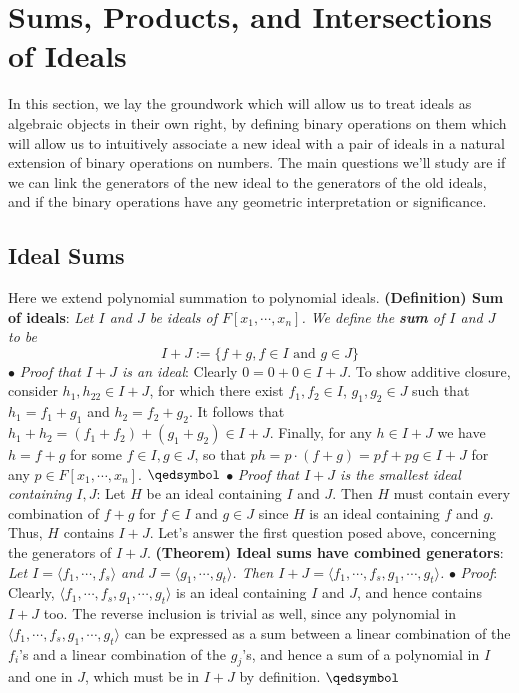 \documentclass{article}
\newcommand*{\tb}{\textbf}
\newcommand*{\ti}{\textit}
\newcommand*{\n}{\newline}
\newcommand*{\nn}{\newline \newline}
\newcommand*{\Fx}{\ensuremath{F[x_1, \cdots, x_n]}}
\newcommand*{\fs}{f_1, \cdots, f_s}
\newcommand*{\gt}{g_1, \cdots, g_t}
\newcommand*{\lfsr}{\langle f_1, \cdots, f_s \rangle}
\begin{document}
\section{Sums, Products, and Intersections of Ideals}
In this section, we lay the groundwork which will allow us to treat ideals as algebraic objects in their own right, by defining binary operations on them which will allow us to intuitively associate a new ideal with a pair of ideals in a natural extension of binary operations on numbers. The main questions we'll study are if we can link the generators of the new ideal to the generators of the old ideals, and if the binary operations have any geometric interpretation or significance.

\subsection{Ideal Sums}
Here we extend polynomial summation to polynomial ideals.
\nn
\tb{(Definition) Sum of ideals}: \ti{Let $ I $ and $ J $ be ideals of $ \Fx $. We define the \tb{sum} of $ I $ and $ J $ to be}
$$ I + J := \{ f + g, f \in I \text{ and } g \in J \} $$
\indent $ \bullet $ \ti{Proof that $ I + J $ is an ideal}: Clearly $ 0 = 0 + 0 \in I + J $. To show additive closure, consider $ h_1, h_22 \in I + J $, for which there exist $ f_1, f_2 \in I $, $ g_1, g_2 \in J $ such that $ h_1 = f_1 + g_1 $ and $ h_2 = f_2 + g_2 $. It follows that $ h_1 + h_2 = (f_1 + f_2) + (g_1 + g_2) \in I + J $. Finally, for any $ h \in I + J $ we have $ h = f + g $ for some $ f \in I, g \in J $, so that $ p h = p \cdot (f + g) = p f + p g \in I + J $ for any $ p \in \Fx $. $ \qedsymbol $
\n
\indent $ \bullet $ \ti{Proof that $ I + J $ is the smallest ideal containing $ I, J $}: Let $ H $ be an ideal containing $ I $ and $ J $. Then $ H $ must contain every combination of $ f + g $ for $ f \in I $ and $ g \in J $ since $ H $ is an ideal containing $ f $ and $ g $. Thus, $ H $ contains $ I + J $.
\nn
Let's answer the first question posed above, concerning the generators of $ I + J $.
\nn
\tb{(Theorem) Ideal sums have combined generators}: \ti{Let $ I = \lfsr $ and $ J = \langle \gt \rangle $. Then $ I + J = \langle \fs, \gt \rangle $.}
\n
\indent $ \bullet $ \ti{Proof}: Clearly, $ \langle \fs, \gt \rangle $ is an ideal containing $ I $ and $ J $, and hence contains $ I + J $ too. The reverse inclusion is trivial as well, since any polynomial in $ \langle \fs, \gt \rangle $ can be expressed as a sum between a linear combination of the $ f_i $'s and a linear combination of the $ g_j $'s, and hence a sum of a polynomial in $ I $ and one in $ J $, which must be in $ I + J $ by definition. $ \qedsymbol $
\end{document}
